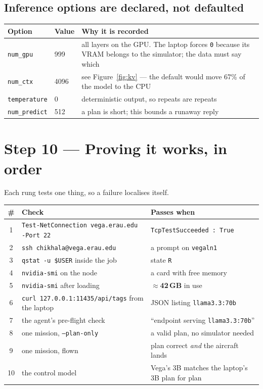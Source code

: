 \documentclass[11pt,a4paper]{article}
\begin{document}
\subsection{Inference options are declared, not defaulted}

\begin{center}
\begin{tabularx}{\linewidth}{@{}l l X@{}}
\toprule
\textbf{Option} & \textbf{Value} & \textbf{Why it is recorded} \\
\midrule
\texttt{num\_gpu} & 999 & all layers on the GPU. The laptop forces \texttt{0}
because its VRAM belongs to the simulator; the data must say which \\
\texttt{num\_ctx} & 4096 & see Figure~\ref{fig:kv} --- the default would move
67\% of the model to the CPU \\
\texttt{temperature} & 0 & deterministic output, so repeats are repeats \\
\texttt{num\_predict} & 512 & a plan is short; this bounds a runaway reply \\
\bottomrule
\end{tabularx}
\end{center}

\section{Step 10 --- Proving it works, in order}

Each rung tests one thing, so a failure localises itself.

\begin{center}
\begin{tabularx}{\linewidth}{@{}c >{\raggedright\arraybackslash}p{5.0cm} X@{}}
\toprule
\textbf{\#} & \textbf{Check} & \textbf{Passes when} \\
\midrule
1 & \texttt{Test-NetConnection vega.erau.edu -Port 22} & \texttt{TcpTestSucceeded : True} \\
2 & \texttt{ssh chikhala@vega.erau.edu} & a prompt on \texttt{vegaln1} \\
3 & \texttt{qstat -u \$USER} inside the job & state \texttt{R} \\
4 & \texttt{nvidia-smi} on the node & a card with free memory \\
5 & \texttt{nvidia-smi} after loading & $\approx$\textbf{42\,GB} in use \\
6 & \texttt{curl 127.0.0.1:11435/api/tags} from the laptop & JSON listing \texttt{llama3.3:70b} \\
7 & the agent's pre-flight check & ``endpoint serving \texttt{llama3.3:70b}'' \\
8 & one mission, \texttt{--plan-only} & a valid plan, no simulator needed \\
9 & one mission, flown & plan correct \emph{and} the aircraft lands \\
10 & the control model & Vega's 3B matches the laptop's 3B plan for plan \\
\bottomrule
\end{tabularx}
\end{center}
\end{document}
